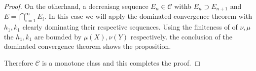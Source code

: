 \documentclass[11pt]{amsart}
\theoremstyle{definition}
\def\scriptc{{\mathcal C}}
\begin{document}
\begin{proof}
	 On the otherhand, a decreaisng sequence $E_n \in \scriptc$ withb $E_n \supset E_{n+1}$ and $E = \bigcap_{i=1}^\infty E_i.$ In this case we will apply the dominated convergence theorem with $h_1, k_1$ clearly dominating their respective sequences. Using the finiteness of of $\nu, \mu$ the $h_1, k_1$ are bounded by $\mu(X), \nu(Y)$ respectively. the conclusion of the dominated convergence theorem shows the proposition.


	 Therefore $\scriptc$ is a monotone class and this completes the proof.
\end{proof}
\end{document}
